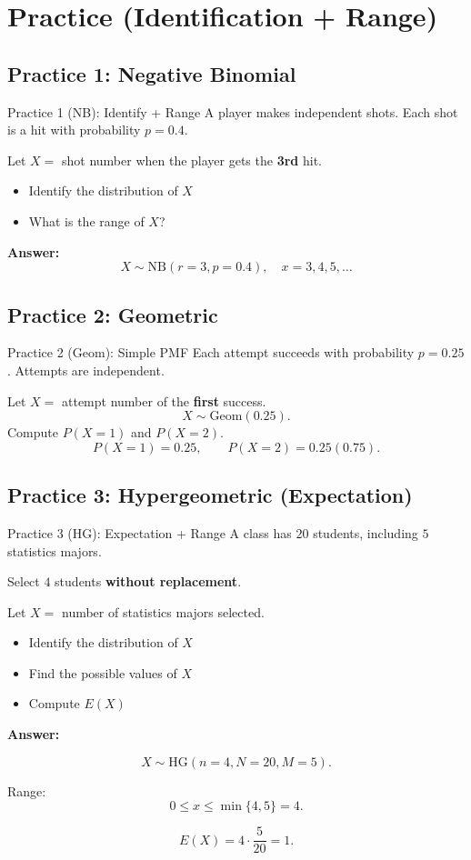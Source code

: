 \documentclass{beamer}
\begin{document}
\section{Practice (Identification + Range)}

\subsection{Practice 1: Negative Binomial}

\begin{frame}{Practice 1 (NB): Identify + Range}
A player makes independent shots. Each shot is a hit with probability $p=0.4$.

Let $X=$ shot number when the player gets the \textbf{3rd} hit.
\begin{itemize}
  \item Identify the distribution of $X$
  \item What is the range of $X$?
\end{itemize}
\pause
\textbf{Answer:}
\[
X\sim \mathrm{NB}(r=3,p=0.4),\quad x=3,4,5,\dots
\]
\end{frame}

\subsection{Practice 2: Geometric}

\begin{frame}{Practice 2 (Geom): Simple PMF}
Each attempt succeeds with probability $p=0.25$. Attempts are independent.

Let $X=$ attempt number of the \textbf{first} success.
\[
X\sim \mathrm{Geom}(0.25).
\]
\pause
Compute $P(X=1)$ and $P(X=2)$.
\pause
\[
P(X=1)=0.25,\qquad P(X=2)=0.25(0.75).
\]
\end{frame}

\subsection{Practice 3: Hypergeometric (Expectation)}

\begin{frame}{Practice 3 (HG): Expectation + Range}
A class has $20$ students, including $5$ statistics majors.

Select $4$ students \textbf{without replacement}.

Let $X=$ number of statistics majors selected.

\begin{itemize}
  \item Identify the distribution of $X$
  \item Find the possible values of $X$
  \item Compute $E(X)$
\end{itemize}

\pause

\textbf{Answer:}

\[
X\sim \mathrm{HG}(n=4, N=20, M=5).
\]

Range:
\[
0 \le x \le \min\{4,5\}=4.
\]

\[
E(X)=4\cdot\frac{5}{20}=1.
\]
\end{frame}
\end{document}
